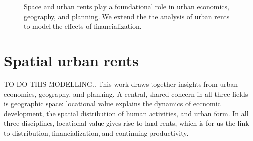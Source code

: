 \begin{figure}[!ht]

\caption[Linking space and urban rents to the effects of financialization.]{Space and urban rents play a foundational role in urban economics, geography, and planning. We extend the the analysis of urban rents to model the effects of financialization.}
\label{fig-fields}
\end{figure}
\section{Spatial urban rents}
TO DO THIS MODELLING..
This work draws together insights from urban economics, geography, and planning. A central, shared concern in all three fields is geographic space: locational value explains the dynamics of economic development, the spatial distribution of human activities, and urban form.  
In all three disciplines, locational value gives rise to land rents, which is for us the link to distribution, financialization, and continuing productivity.  

